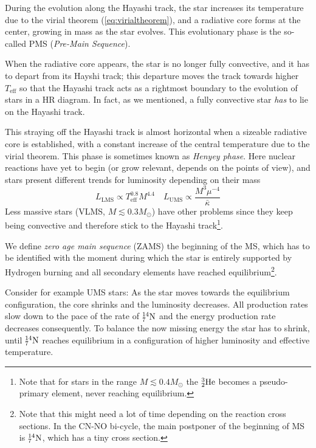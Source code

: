 \par During the evolution along the Hayashi track, the star increases its temperature due to the virial theorem (\ref{eq:virialtheorem}), and a radiative core forms at the center, growing in mass as the star evolves. This evolutionary phase is the so-called PMS (\emph{Pre-Main Sequence}).
\par When the radiative core appears, the star is no longer fully convective, and it has to depart from its Hayshi track; this departure moves the track towards higher $T_{\text{eff}}$ so that the Hayashi track acts as a rightmost boundary to the evolution of stars in a HR diagram. In fact, as we mentioned, a fully convective star \emph{has} to lie on the Hayashi track.
\par This straying off the Hayashi track is almost horizontal when a sizeable radiative core is established, with a constant increase of the central temperature due to the virial theorem. This phase is sometimes known as \emph{Henyey phase}. Here nuclear reactions have yet to begin (or grow relevant, depends on the points of view), and stars present different trends for luminosity depending on their mass
\begin{equation*}
    L_{\text{LMS}}\propto T_{\text{eff}}^{0.8}M^{4.4} \quad L_{\text{UMS}}\propto \frac{M^{3}\mu^{-4}}{\bar{\kappa}}
\end{equation*}
Less massive stars (VLMS, $M\lesssim 0.3M_{\odot}$) have other problems since they keep being convective and therefore stick to the Hayashi track\footnote{Note that for stars in the range $M \lesssim 0.4M_{\odot}$ the $\element{He}{3}{2}$ becomes a pseudo-primary element, never reaching equilibrium.}.
\par We define \emph{zero age main sequence} (ZAMS) the beginning of the MS, which has to be identified with the moment during which the star is entirely supported by Hydrogen burning and all secondary elements have reached equilibrium\footnote{Note that this might need a lot of time depending on the reaction cross sections. In the CN-NO bi-cycle, the main postponer of the beginning of MS is $\element{N}{14}{7}$, which has a tiny cross section.}.
\par Consider for example UMS stars: As the star moves towards the equilibrium configuration, the core shrinks and the luminosity decreases. All production rates slow down to the pace of the rate of $\element{N}{14}{7}$ and the energy production rate decreases consequently. To balance the now missing energy the star has to shrink, until $\element{N}{14}{7}$ reaches equilibrium in a configuration of higher luminosity and effective temperature.

